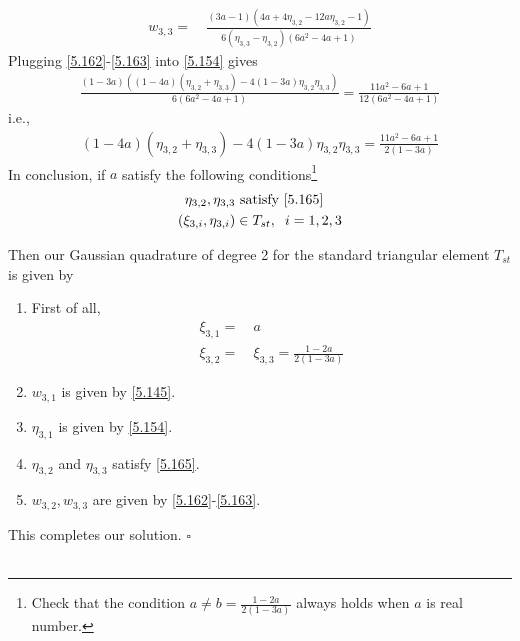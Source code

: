 \documentclass[a4paper]{article}
\numberwithin{equation}{section}
\begin{document}
\begin{enumerate}
\begin{align}
{w_{3,3}} =&\ \frac{{\left( {3a - 1} \right)\left( {4a + 4{\eta _{3,2}} - 12a{\eta _{3,2}} - 1} \right)}}{{6\left( {{\eta _{3,3}} - {\eta _{3,2}}} \right)\left( {6{a^2} - 4a + 1} \right)}} \label{5.163}
\end{align}
Plugging \eqref{5.162}-\eqref{5.163} into \eqref{5.154} gives
\begin{align}
\frac{{\left( {1 - 3a} \right)\left( {\left( {1 - 4a} \right)\left( {{\eta _{3,2}} + {\eta _{3,3}}} \right) - 4\left( {1 - 3a} \right){\eta _{3,2}}{\eta _{3,3}}} \right)}}{{6\left( {6{a^2} - 4a + 1} \right)}} = \frac{{11{a^2} - 6a + 1}}{{12\left( {6{a^2} - 4a + 1} \right)}}
\end{align}
i.e.,
\begin{align}
\label{5.165}
\left( {1 - 4a} \right)\left( {{\eta _{3,2}} + {\eta _{3,3}}} \right) - 4\left( {1 - 3a} \right){\eta _{3,2}}{\eta _{3,3}} = \frac{{11{a^2} - 6a + 1}}{{2\left( {1 - 3a} \right)}}
\end{align}
In conclusion, if $a$ satisfy the following conditions\footnote{Check that the condition $a \ne b = \frac{{1 - 2a}}{{2\left( {1 - 3a} \right)}}$ always holds when $a$ is real number.}
\begin{align}
{\eta _{3,2}},{\eta _{3,3}}& \mbox{ satisfy \eqref{5.165}}\\
\left( {{\xi _{3,i}},{\eta _{3,i}}} \right) &\in {T_{st}},\hspace{0.2cm} i = 1,2,3
\end{align}

Then our Gaussian quadrature of degree 2 for the standard triangular element $T_{st}$ is given by
\begin{enumerate}
\item First of all,
\begin{align}
{\xi _{3,1}} =&\ a\\
{\xi _{3,2}} =&\ {\xi _{3,3}} = \frac{{1 - 2a}}{{2\left( {1 - 3a} \right)}}
\end{align}
\item $w_{3,1}$ is given by \eqref{5.145}.
\item $\eta _{3,1}$ is given by \eqref{5.154}.
\item $\eta _{3,2}$ and $\eta _{3,3}$ satisfy \eqref{5.165}.
\item $w _{3,2},w_{3,3}$ are given by \eqref{5.162}-\eqref{5.163}.
\end{enumerate}
\end{enumerate}
This completes our solution. \hfill $\square$\\
\\
\end{document}
